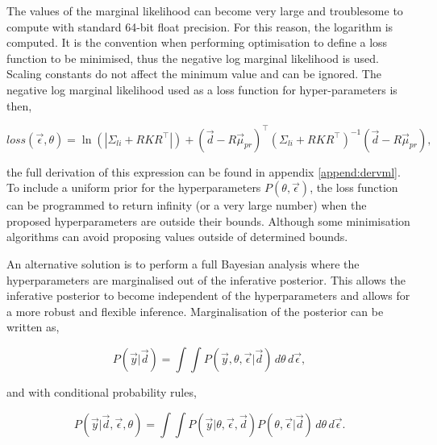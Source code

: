 \noindent The values of the marginal likelihood can become very large and troublesome to compute with standard 64-bit float precision. For this reason, the logarithm is computed. It is the convention when performing optimisation to define a loss function to be minimised, thus the negative log marginal likelihood is used. Scaling constants do not affect the minimum value and can be ignored. The negative log marginal likelihood used as a loss function for hyper-parameters is then,

\begin{equation}
loss(\vec \epsilon,\theta) = \ln(|\Sigma_{li}+RKR^\top|) +  (\vec{d} - R\vec{\mu}_{pr})^{\top} (\Sigma_{li} + R K R^{\top})^{-1} (\vec{d} - R\vec{\mu}_{pr}),
\label{eq:loss}
\end{equation}

\noindent the full derivation of this expression can be found in appendix \ref{append:dervml}. To include a uniform prior for the hyperparameters $P(\theta, \vec{\epsilon})$, the loss function can be programmed to return infinity (or a very large number) when the proposed hyperparameters are outside their bounds. Although some minimisation algorithms can avoid proposing values outside of determined bounds.

An alternative solution is to perform a full Bayesian analysis where the hyperparameters are marginalised out of the inferative posterior. This allows the inferative posterior to become independent of the hyperparameters and allows for a more robust and flexible inference. Marginalisation of the posterior can be written as,

\begin{equation} 
  P(\vec{y}|\vec{d}) = \int \int P(\vec y, \theta, \vec \epsilon|\vec d) \, d\theta \, d\vec \epsilon ,
\end{equation}

and with conditional probability rules,

\begin{equation}
  P(\vec{y}|\vec{d},\vec \epsilon, \theta) = \int \int P(\vec y | \theta, \vec \epsilon, \vec d) P(\theta, \vec \epsilon|\vec d) \, d\theta \, d\vec \epsilon.
\end{equation}

